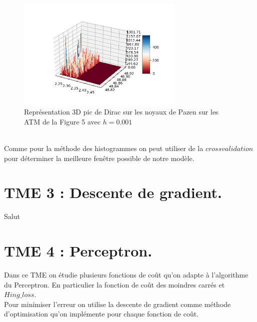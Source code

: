 \documentclass{article}
\begin{document}
\begin{figure}[h]
	\center
	\includegraphics[width=8cm]{../tme2/parzen3Dh=001.png} 
	 \caption{Représentation 3D pic de Dirac sur les noyaux de Pazen sur les ATM de la Figure 5 avec $h=0.001$ }
	 
\end{figure}
\\
Comme pour la méthode des histogrammes on peut utiliser de la $cross validation$ pour déterminer la meilleure fenêtre possible de notre modèle.
\clearpage
\section{TME 3 : Descente de gradient.}
Salut
\section{TME 4 : Perceptron.}
Dans ce TME on étudie plusieurs fonctions de coût qu'on adapte à l'algorithme du Perceptron. En particulier la fonction de coût des moindres carrés et $Hing\_loss$.\\
Pour minimiser l'erreur on utilise la descente de gradient comme méthode d'optimisation qu'on implémente pour chaque fonction de coût.\\
\end{document}

